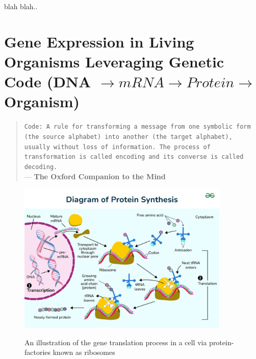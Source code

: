 \documentclass[a4paper, 18pt]{article} %
\begin{document}
blah blah..


\section{Gene Expression in Living Organisms Leveraging Genetic Code (DNA $\rightarrow mRNA \rightarrow Protein \rightarrow$ Organism)}
\label{SEC05}


\begin{quotation}
\noindent \texttt{Code: A rule for transforming a message from one symbolic form (the source alphabet) into another (the target alphabet), usually without loss of information. The process of transformation is called encoding and its converse is called decoding.}\\
\hspace*{\fill} --- \textbf{The Oxford Companion to the Mind}\cite{gregory1987oxford}
\end{quotation}



\begin{figure}[H]
	\begin{center}
		\includegraphics[width=0.9\textwidth]{resources/images/protein_synthesis.png} \\
		\caption{An illustration of the gene translation process in a cell via protein-factories known as ribosomes\cite{geeksforgeeks2024protein}}
		\label{FIG2}
\end{center}
\end{figure}
    
\end{document}

